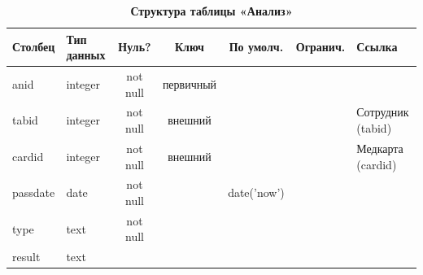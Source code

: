 \documentclass[14pt,a4paper,russian]{extreport}
\begin{document}
\begin{table}[h!]
    \caption{ } 
    \begin{subtable}[t]{\textwidth}
        \caption{\textbf{Структура таблицы «Анализ»}}
    \begin{tabularx}{\textwidth}{| X | X | c | c | c | c | X |}
        \hline
        \textbf{Столбец} & \textbf{Тип данных} & \textbf{Нуль?} & \textbf{Ключ} & \textbf{По
        умолч.} & \textbf{Огранич.} & \textbf{Ссылка} \\ \hline
        anid & integer & not null & первичный & & & \\ \hline
        tabid & integer & not null & внешний & & & Сотрудник (tabid) \\ \hline
        cardid & integer & not null & внешний & & & Медкарта (cardid) \\ \hline
        passdate & date & not null & & date('now') & & \\ \hline
        type & text & not null & & & & \\ \hline
        result & text & & & & & \\ \hline
    \end{tabularx}
    \end{subtable}
    \label{table:analysis}
\end{table}
\end{document}
